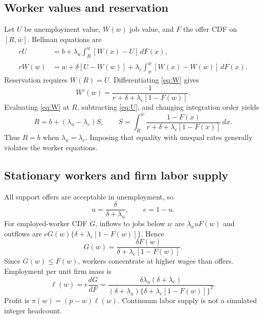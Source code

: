 \documentclass[11pt,letterpaper]{article}
\begin{document}
\subsection{Worker values and reservation}
Let $U$ be unemployment value, $W(w)$ job value, and $F$ the offer CDF
on $[R,\bar w]$. Bellman equations are
\begin{align}
rU&=b+\lambda_u\int_R^{\bar w}[W(x)-U]\,dF(x),\label{eq:U}\\
rW(w)&=w+\delta[U-W(w)]
 +\lambda_e\int_w^{\bar w}[W(x)-W(w)]\,dF(x).\label{eq:W}
\end{align}
Reservation requires $W(R)=U$. Differentiating \eqref{eq:W} gives
\[
W'(w)=\frac{1}{r+\delta+\lambda_e[1-F(w)]}.
\]
Evaluating \eqref{eq:W} at $R$, subtracting \eqref{eq:U}, and
changing integration order yields
\begin{equation}
R=b+(\lambda_u-\lambda_e)S,\qquad
S=\int_R^{\bar w}\frac{1-F(x)}
 {r+\delta+\lambda_e[1-F(x)]}\,dx.\label{eq:reservation}
\end{equation}
Thus $R=b$ when $\lambda_u=\lambda_e$. Imposing that equality
with unequal rates generally violates the worker equations.

\subsection{Stationary workers and firm labor supply}
All support offers are acceptable in unemployment, so
\[
u=\frac{\delta}{\delta+\lambda_u},\qquad e=1-u.
\]
For employed-worker CDF $G$, inflows to jobs below $w$ are
$\lambda_u uF(w)$ and outflows are
$eG(w)\{\delta+\lambda_e[1-F(w)]\}$. Hence
\begin{equation}
G(w)=\frac{\delta F(w)}{\delta+\lambda_e[1-F(w)]}.\label{eq:G}
\end{equation}
Since $G(w)\le F(w)$, workers concentrate at higher wages than offers.
Employment per unit firm mass is
\begin{equation}
\ell(w)=e\frac{dG}{dF}
=\frac{\delta\lambda_u(\delta+\lambda_e)}
 {(\delta+\lambda_u)\{\delta+\lambda_e[1-F(w)]\}^2}.\label{eq:l}
\end{equation}
Profit is $\pi(w)=(p-w)\ell(w)$. Continuum labor supply is not a
simulated integer headcount.
\end{document}
